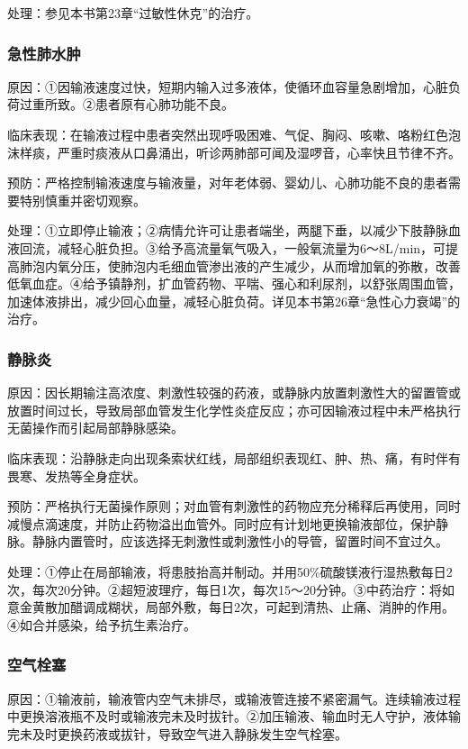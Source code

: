 处理：参见本书第23章“过敏性休克”的治疗。

\subsubsection{急性肺水肿}

原因：①因输液速度过快，短期内输入过多液体，使循环血容量急剧增加，心脏负荷过重所致。②患者原有心肺功能不良。

临床表现：在输液过程中患者突然出现呼吸困难、气促、胸闷、咳嗽、咯粉红色泡沫样痰，严重时痰液从口鼻涌出，听诊两肺部可闻及湿啰音，心率快且节律不齐。

预防：严格控制输液速度与输液量，对年老体弱、婴幼儿、心肺功能不良的患者需要特别慎重并密切观察。

处理：①立即停止输液；②病情允许可让患者端坐，两腿下垂，以减少下肢静脉血液回流，减轻心脏负担。③给予高流量氧气吸入，一般氧流量为6～8L/min，可提高肺泡内氧分压，使肺泡内毛细血管渗出液的产生减少，从而增加氧的弥散，改善低氧血症。④给予镇静剂，扩血管药物、平喘、强心和利尿剂，以舒张周围血管，加速体液排出，减少回心血量，减轻心脏负荷。详见本书第26章“急性心力衰竭”的治疗。

\subsubsection{静脉炎}

原因：因长期输注高浓度、刺激性较强的药液，或静脉内放置刺激性大的留置管或放置时间过长，导致局部血管发生化学性炎症反应；亦可因输液过程中未严格执行无菌操作而引起局部静脉感染。

临床表现：沿静脉走向出现条索状红线，局部组织表现红、肿、热、痛，有时伴有畏寒、发热等全身症状。

预防：严格执行无菌操作原则；对血管有刺激性的药物应充分稀释后再使用，同时减慢点滴速度，并防止药物溢出血管外。同时应有计划地更换输液部位，保护静脉。静脉内置管时，应该选择无刺激性或刺激性小的导管，留置时间不宜过久。

处理：①停止在局部输液，将患肢抬高并制动。并用50\%硫酸镁液行湿热敷每日2次，每次20分钟。②超短波理疗，每日1次，每次15～20分钟。③中药治疗：将如意金黄散加醋调成糊状，局部外敷，每日2次，可起到清热、止痛、消肿的作用。④如合并感染，给予抗生素治疗。

\subsubsection{空气栓塞}

原因：①输液前，输液管内空气未排尽，或输液管连接不紧密漏气。连续输液过程中更换溶液瓶不及时或输液完未及时拔针。②加压输液、输血时无人守护，液体输完未及时更换药液或拔针，导致空气进入静脉发生空气栓塞。

